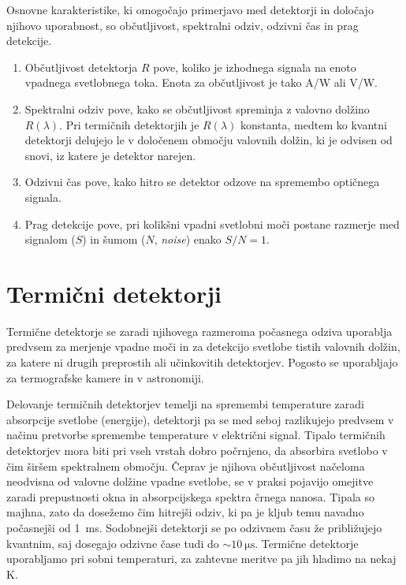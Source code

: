 Osnovne karakteristike, ki omogočajo primerjavo med detektorji in določajo njihovo uporabnost,
so občutljivost, spektralni odziv, odzivni čas in prag detekcije. 

\begin{enumerate}
\item Občutljivost detektorja $R$ pove, koliko je izhodnega signala 
na enoto vpadnega svetlobnega toka. Enota za občutljivost je tako A/W ali V/W. 
\item Spektralni odziv pove, kako se občutljivost spreminja z valovno dolžino $R(\lambda)$.
Pri termičnih detektorjih je $R(\lambda)$ konstanta, medtem ko kvantni detektorji 
delujejo le v določenem območju valovnih dolžin, ki je odvisen od snovi, 
iz katere je detektor narejen. 
\item Odzivni čas pove, kako hitro se detektor odzove na spremembo optičnega signala. 
\item Prag detekcije pove, pri kolikšni vpadni svetlobni moči postane razmerje med signalom ($S$)
in šumom ($N$, {\it noise}) enako $S/N = 1$. 
\end{enumerate}

\section{Termični detektorji}
Termične detektorje se zaradi njihovega razmeroma počasnega odziva uporablja predvsem 
za merjenje vpadne moči in za detekcijo svetlobe tistih valovnih dolžin, za katere 
ni drugih preprostih ali učinkovitih detektorjev. Pogosto se uporabljajo za termografske 
kamere in v astronomiji.

Delovanje termičnih detektorjev temelji na spremembi temperature zaradi absorpcije svetlobe 
(energije), detektorji pa se med seboj razlikujejo predvsem v načinu pretvorbe spremembe 
temperature v električni signal.
Tipalo termičnih detektorjev mora biti pri vseh vrstah dobro počrnjeno, da absorbira
svetlobo v čim širšem spektralnem območju. Čeprav je njihova občutljivost načeloma 
neodvisna od valovne dolžine vpadne svetlobe, se v praksi pojavijo omejitve zaradi
prepustnosti okna in absorpcijskega spektra črnega nanosa. Tipala so majhna, zato 
da dosežemo čim hitrejši odziv, ki pa je kljub temu navadno počasnejši od 1~ms. Sodobnejši
detektorji se po odzivnem času že približujejo kvantnim, saj dosegajo odzivne čase tudi do
$\sim 10~\si{\micro\second}$. Termične detektorje uporabljamo pri sobni temperaturi, 
za zahtevne meritve pa jih hladimo na nekaj K. 

